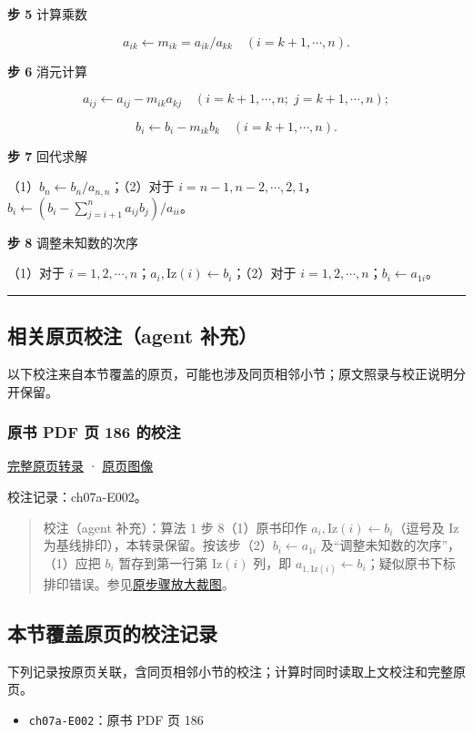 \documentclass[
  10pt,
  fontset=fandol]{ctexart}
\providecommand{\tightlist}{%
  \setlength{\itemsep}{0pt}\setlength{\parskip}{0pt}}
\begin{document}
\textbf{步 5} 计算乘数

\[a_{ik}\leftarrow m_{ik}=a_{ik}/a_{kk}\quad(i=k+1,\cdots,n).\]

\textbf{步 6} 消元计算

\[a_{ij}\leftarrow a_{ij}-m_{ik}a_{kj}\quad(i=k+1,\cdots,n;\;j=k+1,\cdots,n);\]

\[b_i\leftarrow b_i-m_{ik}b_k\quad(i=k+1,\cdots,n).\]

\textbf{步 7} 回代求解

（1）\(b_n\leftarrow b_n/a_{n,n}\)；（2）对于 \(i=n-1,n-2,\cdots,2,1\)，\(b_i\leftarrow\left(b_i-\sum_{j=i+1}^{n}a_{ij}b_j\right)/a_{ii}\)。

\textbf{步 8} 调整未知数的次序

（1）对于 \(i=1,2,\cdots,n\)；\(a_i,\mathrm{Iz}(i)\leftarrow b_i\)；（2）对于 \(i=1,2,\cdots,n\)；\(b_i\leftarrow a_{1i}\)。

\begin{center}\rule{0.5\linewidth}{0.5pt}\end{center}

\subsection{相关原页校注（agent 补充）}\label{ux76f8ux5173ux539fux9875ux6821ux6ce8agent-ux8865ux5145}

以下校注来自本节覆盖的原页，可能也涉及同页相邻小节；原文照录与校正说明分开保留。

\subsubsection{原书 PDF 页 186 的校注}\label{ux539fux4e66-pdf-ux9875-186-ux7684ux6821ux6ce8}

\href{../pages/pdf-186.md}{完整原页转录} · \href{../../source-images/pdf-186.jpeg}{原页图像}

校注记录：ch07a-E002。

\begin{quote}
校注（agent 补充）：算法 1 步 8（1）原书印作 \(a_i,\mathrm{Iz}(i)\leftarrow b_i\)（逗号及 Iz 为基线排印），本转录保留。按该步（2）\(b_i\leftarrow a_{1i}\) 及``调整未知数的次序''，（1）应把 \(b_i\) 暂存到第一行第 \(\mathrm{Iz}(i)\) 列，即 \(a_{1,\mathrm{Iz}(i)}\leftarrow b_i\)；疑似原书下标排印错误。参见\href{../assets/ch07a/pdf-186-step8-detail.png}{原步骤放大裁图}。
\end{quote}

\subsection{本节覆盖原页的校注记录}\label{ux672cux8282ux8986ux76d6ux539fux9875ux7684ux6821ux6ce8ux8bb0ux5f55}

下列记录按原页关联，含同页相邻小节的校注；计算时同时读取上文校注和完整原页。

\begin{itemize}
\tightlist
\item
  \texttt{ch07a-E002}：原书 PDF 页 186
\end{itemize}
\end{document}
